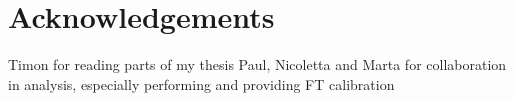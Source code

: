 
\chapter*{Acknowledgements}

Timon for reading parts of my thesis
Paul, Nicoletta and Marta for collaboration in \BdToDD analysis, especially performing and providing FT calibration